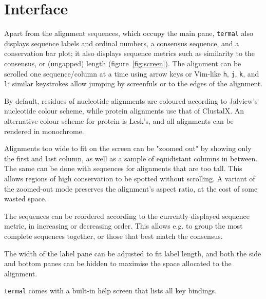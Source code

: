 \documentclass[11pt]{article}
\begin{document}
\section*{Interface}

Apart from the alignment sequences, which occupy the main pane, \texttt{termal}
also displays sequence labels and  ordinal numbers, a consensus sequence, and a
conservation bar plot; it also displays sequence metrics such as similarity to
the consensus, or (ungapped) length (figure~\ref{fig:screen}). The alignment can
be scrolled one sequence/column at a time using arrow keys or Vim-like
\texttt{h}, \texttt{j}, \texttt{k}, and \texttt{l}; similar keystrokes allow
jumping by screenfuls or to the edges of the alignment.

By default, residues of nucleotide alignments are coloured according to
Jalview's\cite{waterhouse2009jalview} nucleotide colour scheme, while protein
alignments use that of ClustalX\cite{larkin2007clustal}. An alternative colour
scheme for protein is Lesk's\cite{lesk2019introduction}, and all alignments can
be rendered in monochrome. 

Alignments too wide to fit on the screen can be "zoomed out" by showing only the
first and last column, as well as a sample of equidistant columns in between.
The same can be done with sequences for alignments that are too tall. This
allows regions of high conservation to be spotted without scrolling. A variant
of the zoomed-out mode preserves the alignment's aspect ratio, at the cost of
some wasted space.

The sequences can be reordered according to the currently-displayed sequence
metric, in increasing or decreasing order. This allows e.g. to group the most
complete sequences together, or those that best match the consensus.

The width of the label pane can be adjusted to fit label length, and both the
side and bottom panes can be hidden to maximise the space allocated to the
alignment.

\texttt{termal} comes with a built-in help screen that lists all key bindings.
\end{document}
